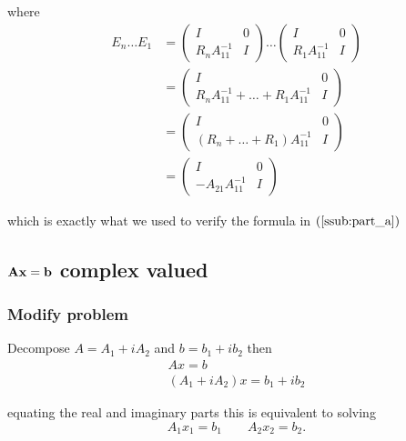     where 
    \begin{align*}
      E_{n} \dots E_1 &= \begin{pmatrix}
        I & 0 \\
        R_{n}A_{11}^{-1} & I
      \end{pmatrix} \dots \begin{pmatrix}
        I & 0 \\
        R_{1}A_{11}^{-1} & I
      \end{pmatrix} \\
                      &= \begin{pmatrix}
                        I & 0 \\
                        R_{n}A_{11}^{-1} + \dots + R_{1}A_{11}^{-1} & I
                      \end{pmatrix} \\
                      &= \begin{pmatrix}
                        I & 0 \\
                        (R_{n} + \dots + R_{1})A_{11}^{-1} & I
                      \end{pmatrix} \\
                      &= \begin{pmatrix}
                        I & 0 \\ -A_{21}A_{11}^{-1} & I
                      \end{pmatrix}
    \end{align*}

    which is exactly what we used to verify the formula in $(\ref{ssub:part_a})$

\subsection{${\bf Ax = b}$ complex valued}%
\label{sub:_bf_ax_b_complex_valued}

\subsubsection{Modify problem}%
\label{ssub:modify_problem}

Decompose $A = A_{1} + iA_2$ and $b = b_1 + ib_2$ then
\begin{gather*}
  Ax = b \\
  (A_1 + iA_2)x = b_1 + i b_2
\end{gather*}

equating the real and imaginary parts this is equivalent to solving 
\[
A_1x_1 = b_1 \qquad A_2x_2 = b_2
.\] 

